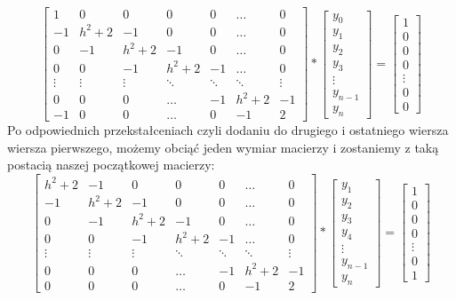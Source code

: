 \documentclass[12pt]{article}
\begin{document}
\[
\begin{bmatrix}
    1 & 0 & 0 & 0 & 0 & \dots & 0\\
    -1 & h^{2}+2 & -1 & 0 & 0 & \dots & 0\\ 
    0 & -1 & h^{2}+2 & -1 & 0 & \dots & 0\\
    0 & 0 & -1 & h^{2}+2 & -1 &\dots & 0\\
    \vdots & \vdots & \vdots & \ddots & \ddots & \ddots & \vdots\\
    0 & 0 & 0 & \hdots & -1 & h^{2}+2 & -1\\
    -1 & 0 & 0 & \hdots & 0 & -1 & 2
\end{bmatrix}
*
\begin{bmatrix}
    y_{0}\\
    y_{1}\\
    y_{2}\\
    y_{3}\\
    \vdots\\
    y_{n-1}\\
    y_{n}
\end{bmatrix}
=
\begin{bmatrix}
    1\\
    0\\
    0\\
    0\\
    \vdots\\
    0\\
    0
\end{bmatrix}
\]
Po odpowiednich przekstałceniach czyli dodaniu do drugiego i ostatniego wiersza wiersza pierwszego, możemy obciąć jeden wymiar macierzy i zostaniemy z taką postacią naszej początkowej macierzy:
\[
\begin{bmatrix}
    h^{2}+2 & -1 & 0 & 0 & 0 & \dots & 0\\
    -1 & h^{2}+2 & -1 & 0 & 0 & \dots & 0\\ 
    0 & -1 & h^{2}+2 & -1 & 0 & \dots & 0\\
    0 & 0 & -1 & h^{2}+2 & -1 &\dots & 0\\
    \vdots & \vdots & \vdots & \ddots & \ddots & \ddots & \vdots\\
    0 & 0 & 0 & \hdots & -1 & h^{2}+2 & -1\\
    0 & 0 & 0 & \hdots & 0 & -1 & 2
\end{bmatrix}
*
\begin{bmatrix}
    y_{1}\\
    y_{2}\\
    y_{3}\\
    y_{4}\\
    \vdots\\
    y_{n-1}\\
    y_{n}
\end{bmatrix}
=
\begin{bmatrix}
    1\\
    0\\
    0\\
    0\\
    \vdots\\
    0\\
    1
\end{bmatrix}
\]
\end{document}
